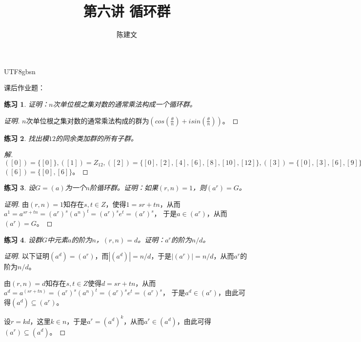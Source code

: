 \documentclass{article}
\newtheorem{Exercise}{练习}
\begin{document}
\begin{CJK*}{UTF8}{gbsn}
  \title{第六讲 循环群}
  \author{陈建文}
  \maketitle
  

课后作业题：
\begin{Exercise}
证明：$n$次单位根之集对数的通常乘法构成一个循环群。
\end{Exercise}
\begin{proof}[证明]
  $n$次单位根之集对数的通常乘法构成的群为$(cos(\frac{\theta}{n})+isin(\frac{\theta}{n}))$。
\end{proof}
\begin{Exercise}
找出模$12$的同余类加群的所有子群。
\end{Exercise}
\begin{proof}[解]
  $([0])=\{[0]\},([1])=Z_{12},([2])=\{[0],[2],[4],[6],[8],[10],[12]\},([3])=\{[0],[3],[6],[9]\},([4])=\{[0],[4],[8]\},$
  $([6])=\{[0],[6]\}$。

\end{proof}
\begin{Exercise}
  设$G=(a)$为一个$n$阶循环群。证明：如果$(r,n)=1$，则$(a^r)=G$。
\end{Exercise}

\begin{proof}[证明]
  由$(r,n)=1$知存在$s,t\in Z$，使得$1=sr+tn$，从而$a^1=a^{sr+tn}=(a^r)^s(a^n)^t=(a^r)^se^t=(a^r)^s$，
  于是$a\in (a^r)$，从而$(a^r)=G$。
\end{proof}
\begin{Exercise}
  设群$G$中元素$a$的阶为$n$，$(r,n)=d$。证明：$a^r$的阶为$n/d$。
\end{Exercise}
\begin{proof}[证明]
  以下证明$(a^d)=(a^r)$，而$|(a^d)|=n/d$，于是$|(a^r)|=n/d$，从而$a^r$的阶为$n/d$。

  由$(r,n)=d$知存在$s,t\in Z$使得$d=sr+tn$，从而$a^d=a^{(sr+tn)}=(a^r)^s(a^n)^t=(a^r)^se^t=(a^r)^s$，
  于是$a^d\in (a^r)$，由此可得$(a^d)\subseteq (a^r)$。

  设$r=kd$，这里$k\in n$，于是$a^r=(a^d)^k$，从而$a^r\in (a^d)$，由此可得$(a^r)\subseteq (a^d)$。
\end{proof}
\end{CJK*}
\end{document}
